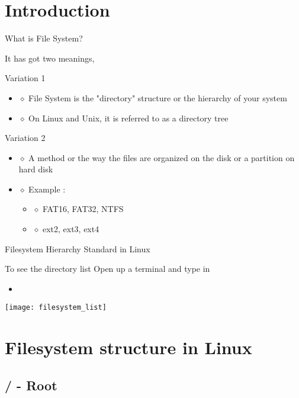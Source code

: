 \documentclass{beamer}
\newcommand{\insertcode}[2]{\begin{itemize}\item[]\end{itemize}} %
\begin{document}
\section{Introduction}
\begin{frame}{What is File System?}

It has got two meanings, 

\begin{block}{Variation 1}
\begin{itemize}
\item[] $\diamond$ File System is the "directory" structure or the hierarchy of your system
\item[] $\diamond$ On Linux and Unix, it is referred to as a directory tree
\end{itemize}

\end{block}
\pause
\begin{block}{Variation 2}
\begin{itemize}
\item[] $\diamond$ A method or the way the files are organized on the disk or a partition on hard disk
\item[] $\diamond$ Example :
   \begin{itemize}
   \item[] $\diamond$ FAT16, FAT32, NTFS
   \item[] $\diamond$ ext2, ext3, ext4
   \end{itemize}
\end{itemize}
\end{block}

\end{frame}

\begin{frame}{Filesystem Hierarchy Standard in Linux}

\begin{block}{To see the directory list}
Open up a terminal and type in
\insertcode{scripts/filesystem_hier.sh}{}
\centering
\texttt{[image: filesystem\_list]}
\end{block}

\end{frame}

\section{Filesystem structure in Linux}
\subsection{/ - Root }
\end{document}
